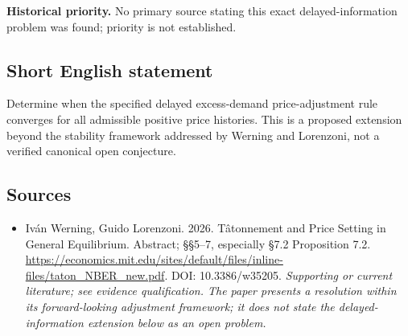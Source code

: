 \documentclass[11pt]{article}
\begin{document}
\par\textbf{Historical priority.} No primary source stating this exact delayed-information problem was found; priority is not established.

\subsection{Short English statement}
Determine when the specified delayed excess-demand price-adjustment rule converges for all admissible positive price histories. This is a proposed extension beyond the stability framework addressed by Werning and Lorenzoni, not a verified canonical open conjecture.

\subsection{Sources}
\begin{itemize}\raggedright
\item[\textnormal{[S1]}]\hypertarget{source:30007552:1}{} Iván Werning, Guido Lorenzoni. 2026. Tâtonnement and Price Setting in General Equilibrium. Abstract; §§5–7, especially §7.2 Proposition 7.2.
\url{https://economics.mit.edu/sites/default/files/inline-files/taton_NBER_new.pdf}.
DOI: 10.3386/w35205.
{\small\textit{Supporting or current literature; see evidence qualification. The paper presents a resolution within its forward-looking adjustment framework; it does not state the delayed-information extension below as an open problem.}}
\end{itemize}
\end{document}
